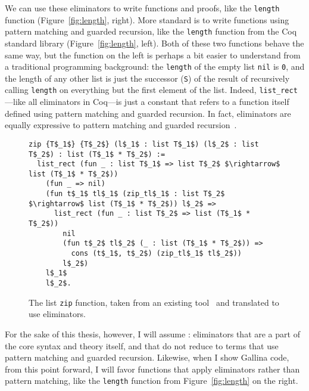 We can use these eliminators to write functions and proofs, like the \lstinline{length} function (Figure~\ref{fig:length}, right).
More standard is to write functions using pattern matching and guarded recursion, like the \lstinline{length} function from the Coq standard library (Figure~\ref{fig:length}, left).
Both of these two functions behave the same way, but the function on the left is perhaps a bit easier to understand from a traditional programming background:
the \lstinline{length} of the empty list \lstinline{nil} is \lstinline{0}, and the length of any other list
is just the successor (\lstinline{S}) of the result of recursively calling \lstinline{length} on everything but the first element of the list.
Indeed, \lstinline{list_rect}---like all eliminators in Coq---is just a constant that refers to a function itself defined using pattern matching and guarded recursion.
In fact, eliminators are equally expressive to pattern matching and guarded recursion~\cite{TODO}. %

\begin{figure}
\begin{lstlisting}
zip {T$_1$} {T$_2$} (l$_1$ : list T$_1$) (l$_2$ : list T$_2$) : list (T$_1$ * T$_2$) :=
  list_rect (fun _ : list T$_1$ => list T$_2$ $\rightarrow$ list (T$_1$ * T$_2$))
    (fun _ => nil)
    (fun t$_1$ tl$_1$ (zip_tl$_1$ : list T$_2$ $\rightarrow$ list (T$_1$ * T$_2$)) l$_2$ =>
      list_rect (fun _ : list T$_2$ => list (T$_1$ * T$_2$))
        nil
        (fun t$_2$ tl$_2$ (_ : list (T$_1$ * T$_2$)) =>
          cons (t$_1$, t$_2$) (zip_tl$_1$ tl$_2$))
        l$_2$)
    l$_1$
    l$_2$.
\end{lstlisting}
\caption{The list \lstinline{zip} function, taken from an existing tool~\cite{TODO} %
and translated to use eliminators.}
\label{fig:zip-elim}
\end{figure}

For the sake of this thesis, however, I will assume : eliminators that are a part of the core syntax and theory itself,
and that do not reduce to terms that use pattern matching and guarded recursion.
Likewise, when I show Gallina code, from this point forward, I will favor functions that apply eliminators rather than pattern matching, like the \lstinline{length} function from Figure~\ref{fig:length}
on the right.

